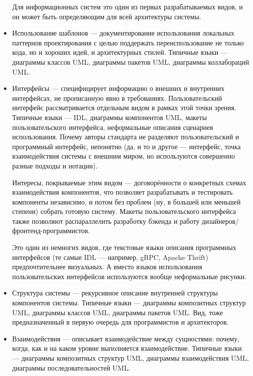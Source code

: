 \documentclass{../mcstext}
\begin{document}
\begin{itemize}
    Для информационных систем это один из первых разрабатываемых видов, и он может быть определяющим для всей архитектуры системы.
    
    \item Использование шаблонов --- документирование использования локальных паттернов проектирования с целью поддержать переиспользование не только кода, но и хороших идей, и архитектурных стилей. Типичные языки --- диаграммы классов UML, диаграммы пакетов UML, диаграммы коллабораций UML.
    
    \item Интерфейсы --- специфицирует информацию о внешних и внутренних интерфейсах, не прописанную явно в требованиях. Пользовательский интерфейс рассматривается отдельным видом в рамках этой точки зрения. Типичные языки --- IDL, диаграммы компонентов UML, макеты пользовательского интерфейса, неформальные описания сценариев использования. Почему авторы стандарта не разделяют пользовательский и программный интерфейс, непонятно (да, и то и другое --- интерфейс, точка взаимодействия системы с внешним миром, но используются совершенно разные подходы и нотации).
    
    Интересы, покрываемые этим видом --- договорённости о конкретных схемах взаимодействия компонентов, что позволяет разрабатывать и тестировать компоненты независимо, и потом без проблем (ну, в большей или меньшей степени) собрать готовую систему. Макеты пользовательского интерфейса также позволяют распараллелить разработку бэкенда и работу дизайнеров/фронтенд-программистов.
    
    Это один из немногих видов, где текстовые языки описания программных интерфейсов (те самые IDL --- например, gRPC, Apache Thrift) предпочтительнее визуальных. А вместо языков использования пользовательских интерфейсов используются вообще неформальные рисунки.
    
    \item Структура системы --- рекурсивное описание внутренней структуры компонентов системы. Типичные языки --- диаграммы композитных структур UML, диаграммы классов UML, диаграммы пакетов UML. Вид, тоже предназначенный в первую очередь для программистов и архитекторов.
    
    \item Взаимодействия --- описывает взаимодействие между сущностями: почему, когда, как и на каком уровне выполняется взаимодействие. Типичные языки --- диаграммы композитных структур UML, диаграммы взаимодействия UML, диаграммы последовательностей UML.
    

\end{itemize}
\end{document}
